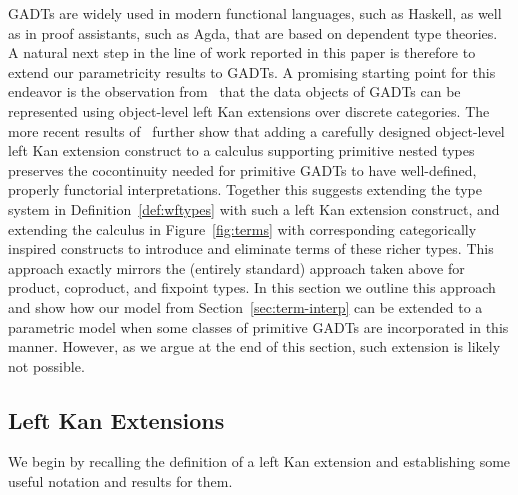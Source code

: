 \documentclass{lmcs}
\theoremstyle{plain}\newtheorem{satz}[thm]{Satz}
\begin{document}
GADTs are widely used in modern functional languages, such as Haskell,
as well as in proof assistants, such as Agda, that are based on
dependent type theories. A natural next step in the line of work
reported in this paper is therefore to extend our parametricity
results to GADTs. A promising starting point for this endeavor is the
observation from~\cite{jg08} that the data objects of GADTs can be
represented using object-level left Kan extensions over discrete
categories. The more recent results of~\cite{jp19} further show that
adding a carefully designed object-level left Kan extension construct
to a calculus supporting primitive nested types preserves the
cocontinuity needed for primitive GADTs to have well-defined, properly
functorial interpretations. Together this suggests extending the type
system in Definition~\ref{def:wftypes} with such a left Kan extension
construct, and extending the calculus in Figure~\ref{fig:terms} with
corresponding categorically inspired constructs to introduce and
eliminate terms of these richer types. This approach exactly mirrors
the (entirely standard) approach taken above for product, coproduct,
and fixpoint types. In this section we outline this approach and show
how our model from Section~\ref{sec:term-interp} can be extended to a
parametric model when some classes of primitive GADTs are incorporated
in this manner. However, as we argue at the end of this section, such
extension is likely not possible.

\subsection{Left Kan Extensions}\label{sec:lke}

We begin by recalling the definition of a left Kan extension and
establishing some useful notation and results for them.
\end{document}
